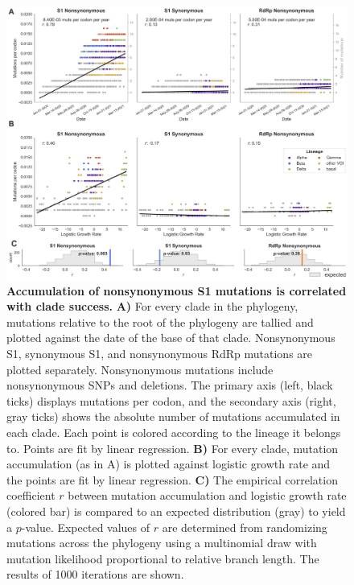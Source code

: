 \documentclass[11pt,oneside,letterpaper]{article}
\begin{document}
\begin{figure}[h!]
	\centerline{\includegraphics[width=1.0\textwidth]{fig1_mutaccumulation.png}}
	\caption{\textbf{Accumulation of nonsynonymous S1 mutations is correlated with clade success.}
	\textbf{A)} For every clade in the phylogeny, mutations relative to the root of the phylogeny are tallied and plotted against the date of the base of that clade. 
	Nonsynonymous S1, synonymous S1, and nonsynonymous RdRp mutations are plotted separately.
	Nonsynonymous mutations include nonsynonymous SNPs and deletions.
	The primary axis (left, black ticks) displays mutations per codon, and the secondary axis (right, gray ticks) shows the absolute number of mutations accumulated in each clade.
	Each point is colored according to the lineage it belongs to.
	Points are fit by linear regression.
	\textbf{B)} For every clade, mutation accumulation (as in A) is plotted against logistic growth rate and the points are fit by linear regression.
	\textbf{C)} The empirical correlation coefficient $r$ between mutation accumulation and logistic growth rate (colored bar) is compared to an expected distribution (gray) to yield a $p$-value.
	Expected values of $r$ are determined from randomizing mutations across the phylogeny using a multinomial draw with mutation likelihood proportional to relative branch length.
	The results of 1000 iterations are shown.
	}
	\label{fig:mutaccumulation}
\end{figure}
\end{document}
